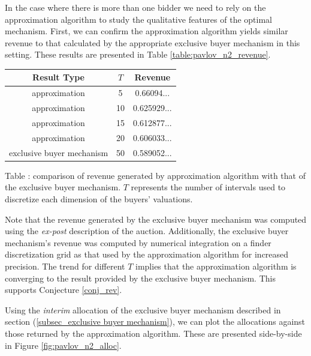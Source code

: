 In the case where there is more than one bidder we need to rely on the approximation algorithm to study the qualitative features of the optimal mechanism. First, we can confirm the approximation algorithm yields similar revenue to that calculated by the appropriate exclusive buyer mechanism in this setting. These results are presented in Table \ref{table:pavlov_n2_revenue}.

\begin{center}
    \begin{tabular}{ |c|c|c| } 
    \hline
    Result Type & $T$ & Revenue \\
    \hline
    \hline
    approximation & 5 & 0.66094... \\ 
    approximation & 10 & 0.625929... \\ 
    approximation & 15 & 0.612877... \\ 
    approximation & 20 & 0.606033... \\ 
    exclusive buyer mechanism & 50 & 0.589052... \\
    \hline
    \end{tabular}

    \vspace{1mm}
    \raggedright{\small {\sc Table \thefig\label{table:pavlov_n2_revenue}:} comparison of revenue generated by approximation algorithm with that of the exclusive buyer mechanism. $T$ represents the number of intervals used to discretize each dimension of the buyers' valuations.}
\end{center}

\noindent Note that the revenue generated by the exclusive buyer mechanism was computed using the \textit{ex-post} description of the auction. Additionally, the exclusive buyer mechanism's revenue was computed by numerical integration on a finder discretization grid as that used by the approximation algorithm for increased precision. The trend for different $T$ implies that the approximation algorithm is converging to the result provided by the exclusive buyer mechanism. This supports Conjecture \ref{conj_rev}. 

Using the \textit{interim} allocation of the exclusive buyer mechanism described in section (\ref{subsec_exclusive buyer mechanism}), we can plot the allocations against those returned by the approximation algorithm. These are presented side-by-side in Figure \ref{fig:pavlov_n2_alloc}.

